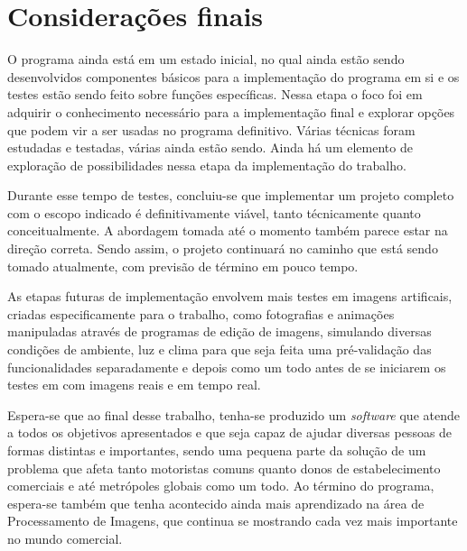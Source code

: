 \chapter{Considerações finais}

O programa ainda está em um estado inicial, no qual ainda estão sendo desenvolvidos componentes básicos para a implementação do programa em si e os testes estão sendo feito sobre funções específicas. Nessa etapa o foco foi em adquirir o conhecimento necessário para a implementação final e explorar opções que podem vir a ser usadas no programa definitivo. Várias técnicas foram estudadas e testadas, várias ainda estão sendo. Ainda há um elemento de exploração de possibilidades nessa etapa da implementação do trabalho.

Durante esse tempo de testes, concluiu-se que implementar um projeto completo com o escopo indicado é definitivamente viável, tanto técnicamente quanto conceitualmente. A abordagem tomada até o momento também parece estar na direção correta. Sendo assim, o projeto continuará no caminho que está sendo tomado atualmente, com previsão de término em pouco tempo.

As etapas futuras de implementação envolvem mais testes em imagens artificais, criadas especificamente para o trabalho, como fotografias e animações manipuladas através de programas de edição de imagens, simulando diversas condições de ambiente, luz e clima para que seja feita uma pré-validação das funcionalidades separadamente e depois como um todo antes de se iniciarem os testes em com imagens reais e em tempo real.

Espera-se que ao final desse trabalho, tenha-se produzido um \textit{software} que atende a todos os objetivos apresentados e que seja capaz de ajudar diversas pessoas de formas distintas e importantes, sendo uma pequena parte da solução de um problema que afeta tanto motoristas comuns quanto donos de estabelecimento comerciais e até metrópoles globais como um todo. Ao término do programa, espera-se também que tenha acontecido ainda mais aprendizado na área de Processamento de Imagens, que continua se mostrando cada vez mais importante no mundo comercial.

 